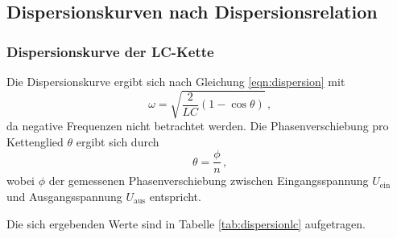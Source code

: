 \FloatBarrier
\subsection{Dispersionskurven nach Dispersionsrelation}

\subsubsection{Dispersionskurve der LC-Kette}
Die Dispersionskurve ergibt sich nach Gleichung \eqref{eqn:dispersion} mit
\begin{equation}
	\label{eqn:dispisi}
	\omega = \sqrt{\frac{2}{LC}(1-\cos\theta)} \, \text{,}
\end{equation}
da negative Frequenzen nicht betrachtet werden.
Die Phasenverschiebung pro Kettenglied $\theta$ ergibt sich durch
\begin{equation}
	\theta = \frac{\phi}{n} \, \text{,}
\end{equation}
wobei $\phi$ der gemessenen Phasenverschiebung zwischen Eingangsspannung $U_{\text{ein}}$
und Ausgangsspannung $U_{\text{aus}}$ entspricht.

Die sich ergebenden Werte sind in Tabelle \ref{tab:dispersionlc} aufgetragen.

